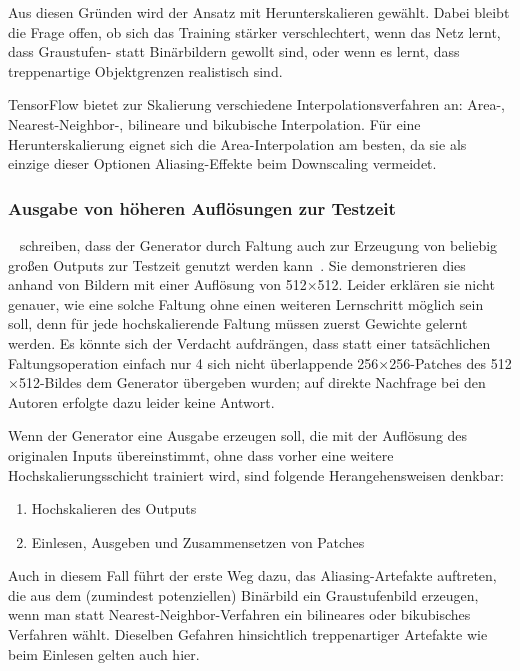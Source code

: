 Aus diesen Gründen wird der Ansatz mit Herunterskalieren gewählt.
Dabei bleibt die Frage offen, ob sich das Training stärker verschlechtert, wenn das Netz lernt, dass Graustufen- statt Binärbildern gewollt sind, oder wenn es lernt, dass treppenartige Objektgrenzen realistisch sind.

TensorFlow bietet zur Skalierung verschiedene Interpolationsverfahren an: Area-, Nearest-Neighbor-, bilineare und bikubische Interpolation.
Für eine Herunterskalierung eignet sich die Area-Interpolation am besten, da sie als einzige dieser Optionen Aliasing-Effekte beim Downscaling vermeidet.



\subsubsection{Ausgabe von höheren Auflösungen zur Testzeit}

\citeauthor{Isola.2017}~\cite{Isola.2017} schreiben, dass der Generator durch Faltung auch zur Erzeugung von beliebig großen Outputs zur Testzeit genutzt werden kann~\cite{Isola.2017}.
Sie demonstrieren dies anhand von Bildern mit einer Auflösung von 512$\times$512.
Leider erklären sie nicht genauer, wie eine solche Faltung ohne einen weiteren Lernschritt möglich sein soll, denn für jede hochskalierende Faltung müssen zuerst Gewichte gelernt werden.
Es könnte sich der Verdacht aufdrängen, dass statt einer tatsächlichen Faltungsoperation einfach nur 4 sich nicht überlappende 256$\times$256-Patches des 512$\times$512-Bildes dem Generator übergeben wurden; auf direkte Nachfrage bei den Autoren erfolgte dazu leider keine Antwort.

Wenn der Generator eine Ausgabe erzeugen soll, die mit der Auflösung des originalen Inputs übereinstimmt, ohne dass vorher eine weitere Hochskalierungsschicht trainiert wird, sind folgende Herangehensweisen denkbar:

\begin{enumerate}
	\item Hochskalieren des Outputs
	\item Einlesen, Ausgeben und Zusammensetzen von Patches
\end{enumerate}

Auch in diesem Fall führt der erste Weg dazu, das Aliasing-Artefakte auftreten, die aus dem (zumindest potenziellen) Binärbild ein Graustufenbild erzeugen, wenn man statt Nearest-Neighbor-Verfahren ein bilineares oder bikubisches Verfahren wählt.
Dieselben Gefahren hinsichtlich treppenartiger Artefakte wie beim Einlesen gelten auch hier.

